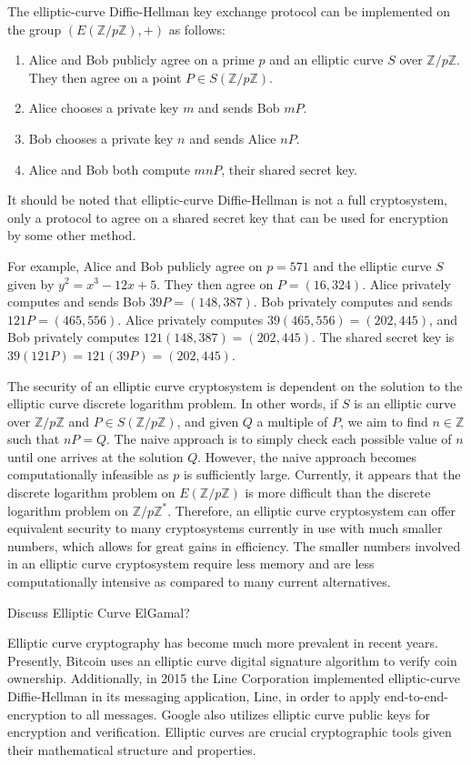 \documentclass{article}
\begin{document}
\indent The elliptic-curve Diffie-Hellman key exchange protocol can be implemented on the group $(E(\mathbb{Z}/p\mathbb{Z}), +)$ as follows:
\begin{enumerate}
\item Alice and Bob publicly agree on a prime $p$ and an elliptic curve $S$ over $\mathbb{Z}/p\mathbb{Z}$. They then agree on a point $P \in S(\mathbb{Z}/p\mathbb{Z})$.
\item Alice chooses a private key $m$ and sends Bob $mP$.
\item Bob chooses a private key $n$ and sends Alice $nP$.
\item Alice and Bob both compute $mnP$, their shared secret key.
\end{enumerate}
It should be noted that elliptic-curve Diffie-Hellman is not a full cryptosystem, only a protocol to agree on a shared secret key that can be used for encryption by some other method.

\indent For example, Alice and Bob publicly agree on $p=571$ and the elliptic curve $S$ given by $y^2=x^3-12x+5$. They then agree on $P=(16,324)$. Alice privately computes and sends Bob $39P=(148,387)$. Bob privately computes and sends $121P=(465,556)$. Alice privately computes $39(465,556)=(202,445)$, and Bob privately computes $121(148,387)=(202,445)$. The shared secret key is $39(121P)=121(39P)=(202,445)$.

\indent The security of an elliptic curve cryptosystem is dependent on the solution to the elliptic curve discrete logarithm problem. In other words, if $S$ is an elliptic curve over $\mathbb{Z}/p\mathbb{Z}$ and $P \in S(\mathbb{Z}/p\mathbb{Z})$, and given $Q$ a multiple of $P$, we aim to find $n\in\mathbb{Z}$ such that $nP=Q$. The naive approach is to simply check each possible value of $n$ until one arrives at the solution $Q$. However, the naive approach becomes computationally infeasible as $p$ is sufficiently large. Currently, it appears that the discrete logarithm problem on $E(\mathbb{Z}/p\mathbb{Z})$ is more difficult than the discrete logarithm problem on $\mathbb{Z}/p\mathbb{Z}^*$. Therefore, an elliptic curve cryptosystem can offer equivalent security to many cryptosystems currently in use with much smaller numbers, which allows for great gains in efficiency. The smaller numbers involved in an elliptic curve cryptosystem require less memory and are less computationally intensive as compared to many current alternatives.

\indent Discuss Elliptic Curve ElGamal?

\indent Elliptic curve cryptography has become much more prevalent in recent years. Presently, Bitcoin uses an elliptic curve digital signature algorithm to verify coin ownership. Additionally, in 2015 the Line Corporation implemented elliptic-curve Diffie-Hellman in its messaging application, Line, in order to apply end-to-end-encryption to all messages. Google also utilizes elliptic curve public keys for encryption and verification. Elliptic curves are crucial cryptographic tools given their mathematical structure and properties.
\end{document}

